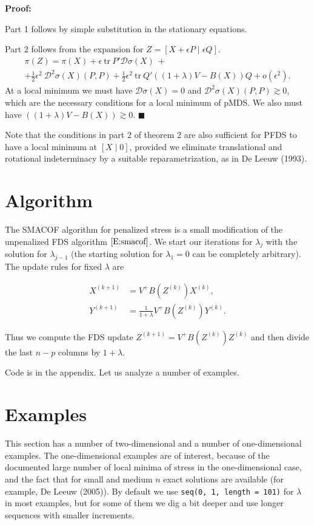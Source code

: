 \documentclass[
  12pt,
]{article}
\begin{document}
\textbf{Proof:}

Part 1 follows by simple substitution in the stationary equations.

Part 2 follows from the expansion for
\(Z=[X+\epsilon P\mid\epsilon Q]\). \begin{multline}\label{E:expand2}
\pi(Z)=\pi(X)+\epsilon\ \text{tr}\ P'\mathcal{D}\sigma(X)\ +\\+\frac12\epsilon^2\ \mathcal{D}^2\sigma(X)(P,P)+\frac12\epsilon^2\ \text{tr}\ Q'((1+\lambda)V-B(X))Q+o(\epsilon^2).
\end{multline} At a local minimum we must have
\(\mathcal{D}\sigma(X)=0\) and \(\mathcal{D}^2\sigma(X)(P,P)\gtrsim 0\),
which are the necessary conditions for a local minimum of pMDS. We also
must have \(((1+\lambda)V-B(X))\gtrsim 0\). \(\blacksquare\)

Note that the conditions in part 2 of theorem 2 are also sufficient for
PFDS to have a local minimum at \([X\mid 0]\), provided we eliminate
translational and rotational indeterminacy by a suitable
reparametrization, as in De Leeuw (1993).

\hypertarget{algorithm}{%
\section{Algorithm}\label{algorithm}}

The SMACOF algorithm for penalized stress is a small modification of the
unpenalized FDS algorithm \(\eqref{E:smacof}\). We start our iterations
for \(\lambda_j\) with the solution for \(\lambda_{j-1}\) (the starting
solution for \(\lambda_1=0\) can be completely arbitrary). The update
rules for fixed \(\lambda\) are

\begin{align}
X^{(k+1)}&=V^+B(Z^{(k)})X^{(k)},\\
Y^{(k+1)}&=\frac{1}{1+\lambda}V^+B(Z^{(k)})Y^{(k)}.
\end{align}

Thus we compute the FDS update \(Z^{(k+1)}=V^+B(Z^{(k)})Z^{(k)}\) and
then divide the last \(n-p\) columns by \(1+\lambda\).

Code is in the appendix. Let us analyze a number of examples.

\hypertarget{examples}{%
\section{Examples}\label{examples}}

This section has a number of two-dimensional and a number of
one-dimensional examples. The one-dimensional examples are of interest,
because of the documented large number of local minima of stress in the
one-dimensional case, and the fact that for small and medium \(n\) exact
solutions are available (for example, De Leeuw (2005)). By default we
use \texttt{seq(0,\ 1,\ length\ =\ 101)} for \(\lambda\) in most
examples, but for some of them we dig a bit deeper and use longer
sequences with smaller increments.
\end{document}
